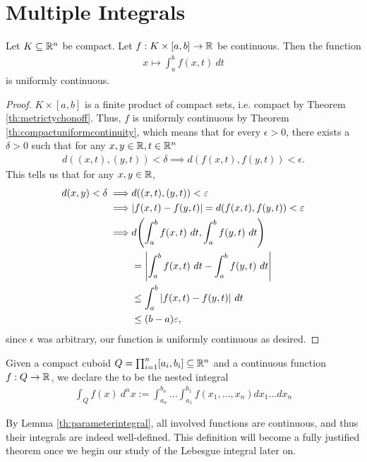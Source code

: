\chapter{Multiple Integrals}
\begin{lemma}
	\label{th:parameterintegral}
	Let $K \subseteq \mathbb{R}^n$ be compact. Let $f : K \times [a,b] \to \mathbb{R}$ be continuous. Then the function
	\begin{align*}
		x \mapsto \int_a^b f(x,t) ~dt
	\end{align*}
	is uniformly continuous.
\end{lemma}
\begin{proof}
	$K \times [a,b]$ is a finite product of compact sets, i.e. compact by Theorem \ref{th:metrictychonoff}. Thus, $f$ is uniformly continuous by Theorem \ref{th:compactuniformcontinuity}, which means that for every $\epsilon > 0$, there exists a $\delta > 0$ such that for any $x,y \in \mathbb{R}, t \in \mathbb{R}^n$
	\begin{align*}
		d((x,t), (y,t)) < \delta \implies d(f(x,t), f(y,t)) < \epsilon.
	\end{align*}
	This tells us that for any $x,y \in \mathbb{R}$,
	\begin{align*}
		d(x,y) < \delta \implies &d((x,t), (y,t)) < \varepsilon\\
		\implies &\abs{f(x,t) - f(y,t)} = d(f(x,t), f(y,t)) < \varepsilon\\
		\implies &d\qty(\int_a^b f(x,t) ~dt, \int_a^b f(y,t) ~dt)\\
		&= \abs{\int_a^b f(x,t) ~dt - \int_a^b f(y,t) ~dt}\\
		&\leq \int_a^b \abs{f(x,t)  -  f(y,t)} ~dt\\
		&\leq (b-a)\varepsilon,
	\end{align*}
	since $\epsilon$ was arbitrary, our function is uniformly continuous as desired.
\end{proof}
\begin{definition}
	Given a compact cuboid $Q = \prod_{i = 1}^n [a_i, b_i] \subseteq \mathbb{R}^n$ and a continuous function $f : Q \to \mathbb{R}$, we declare the  to be the nested integral
	\begin{align*}
		\int_Q f(x) ~d^nx := \int_{a_n}^{b_n} \hdots \int_{a_1}^{b_1} f(x_1, \hdots, x_n) dx_1 \hdots dx_n
	\end{align*}
\end{definition}
By Lemma \ref{th:parameterintegral}, all involved functions are continuous, and thus their integrals are indeed well-defined. This definition will become a fully justified theorem once we begin our study of the Lebesgue integral later on.

